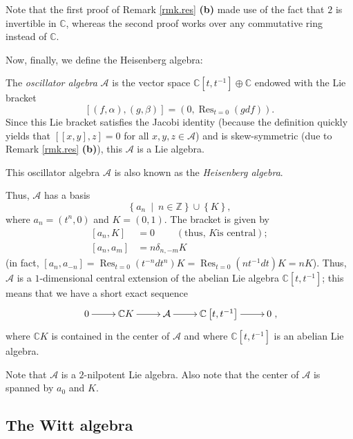 \documentclass[etingof-lie.tex]{subfiles}
\begin{document}
Note that the first proof of Remark \ref{rmk.res} \textbf{(b)} made use of the
fact that $2$ is invertible in $\mathbb{C}$, whereas the second proof works
over any commutative ring instead of $\mathbb{C}$.

Now, finally, we define the Heisenberg algebra:

\begin{definition}
\label{def.osc}The \textit{oscillator algebra} $\mathcal{A}$ is the vector
space $\mathbb{C}\left[  t,t^{-1}\right]  \oplus\mathbb{C}$ endowed with the
Lie bracket%
\[
\left[  \left(  f,\alpha\right)  ,\left(  g,\beta\right)  \right]  =\left(
0,\operatorname*{Res}\nolimits_{t=0}\left(  gdf\right)  \right)  .
\]
Since this Lie bracket satisfies the Jacobi identity (because the definition
quickly yields that $\left[  \left[  x,y\right]  ,z\right]  =0$ for all
$x,y,z\in\mathcal{A}$) and is skew-symmetric (due to Remark \ref{rmk.res}
\textbf{(b)}), this $\mathcal{A}$ is a Lie algebra.

This oscillator algebra $\mathcal{A}$ is also known as the \textit{Heisenberg
algebra}.
\end{definition}

Thus, $\mathcal{A}$ has a basis
\[
\left\{  a_{n}\ \mid\ n\in\mathbb{Z}\right\}  \cup\left\{  K\right\}  ,
\]
where $a_{n}=\left(  t^{n},0\right)  $ and $K=\left(  0,1\right)  $. The
bracket is given by%
\begin{align*}
\left[  a_{n},K\right]   &  =0\ \ \ \ \ \ \ \ \ \ \left(  \text{thus, }K\text{
is central}\right)  ;\\
\left[  a_{n},a_{m}\right]   &  =n\delta_{n,-m}K
\end{align*}
(in fact, $\left[  a_{n},a_{-n}\right]  =\operatorname*{Res}\nolimits_{t=0}%
\left(  t^{-n}dt^{n}\right)  K=\operatorname*{Res}\nolimits_{t=0}\left(
nt^{-1}dt\right)  K=nK$). Thus, $\mathcal{A}$ is a $1$-dimensional central
extension of the abelian Lie algebra $\mathbb{C}\left[  t,t^{-1}\right]  $;
this means that we have a short exact sequence%
\[
\xymatrix{
0 \ar[r] & \mathbb C K \ar[r] & \mathcal A \ar[r] & \mathbb C\left[t,t^{-1}\right] \ar[r] & 0
},
\]
where $\mathbb{C}K$ is contained in the center of $\mathcal{A}$ and where
$\mathbb{C}\left[  t,t^{-1}\right]  $ is an abelian Lie algebra.

Note that $\mathcal{A}$ is a $2$-nilpotent Lie algebra. Also note that the
center of $\mathcal{A}$ is spanned by $a_{0}$ and $K$.

\subsection{The Witt algebra}
\end{document}

